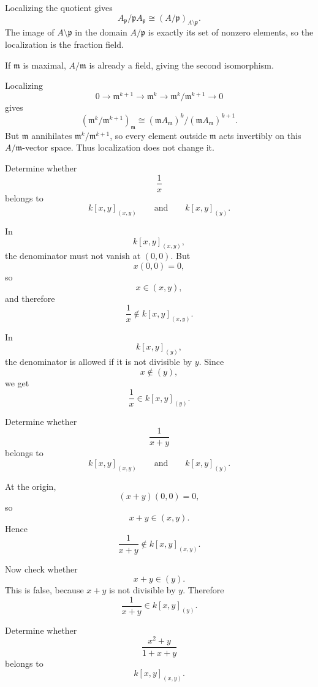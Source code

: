 \begin{solution}
Localizing the quotient gives
\[
A_{\mathfrak p}/\mathfrak pA_{\mathfrak p}
\cong
(A/\mathfrak p)_{A\setminus\mathfrak p}.
\]
The image of \(A\setminus\mathfrak p\) in the domain \(A/\mathfrak p\) is
exactly its set of nonzero elements, so the localization is the fraction
field.

If \(\mathfrak m\) is maximal, \(A/\mathfrak m\) is already a field, giving
the second isomorphism.

Localizing
\[
0\to\mathfrak m^{k+1}\to\mathfrak m^k
\to\mathfrak m^k/\mathfrak m^{k+1}\to0
\]
gives
\[
(\mathfrak m^k/\mathfrak m^{k+1})_{\mathfrak m}
\cong
(\mathfrak mA_{\mathfrak m})^k/
(\mathfrak mA_{\mathfrak m})^{k+1}.
\]
But \(\mathfrak m\) annihilates
\(\mathfrak m^k/\mathfrak m^{k+1}\), so every element outside
\(\mathfrak m\) acts invertibly on this \(A/\mathfrak m\)-vector space.
Thus localization does not change it.
\end{solution}


\begin{problem}[CP-V-0066]
\label{prob:cp-v-0066}
Determine whether
\[
\frac{1}{x}
\]
belongs to
\[
k[x,y]_{(x,y)}
\qquad\text{and}\qquad
k[x,y]_{(y)}.
\]
\end{problem}

\begin{solution}
In
\[
k[x,y]_{(x,y)},
\]
the denominator must not vanish at \((0,0)\). But
\[
x(0,0)=0,
\]
so
\[
x\in (x,y),
\]
and therefore
\[
\frac{1}{x}\notin k[x,y]_{(x,y)}.
\]

In
\[
k[x,y]_{(y)},
\]
the denominator is allowed if it is not divisible by \(y\). Since
\[
x\notin (y),
\]
we get
\[
\frac{1}{x}\in k[x,y]_{(y)}.
\]
\end{solution}


\begin{problem}[CP-V-0067]
\label{prob:cp-v-0067}
Determine whether
\[
\frac{1}{x+y}
\]
belongs to
\[
k[x,y]_{(x,y)}
\qquad\text{and}\qquad
k[x,y]_{(y)}.
\]
\end{problem}

\begin{solution}
At the origin,
\[
(x+y)(0,0)=0,
\]
so
\[
x+y\in (x,y).
\]
Hence
\[
\frac{1}{x+y}\notin k[x,y]_{(x,y)}.
\]

Now check whether
\[
x+y\in (y).
\]
This is false, because \(x+y\) is not divisible by \(y\). Therefore
\[
\frac{1}{x+y}\in k[x,y]_{(y)}.
\]
\end{solution}


\begin{problem}[CP-V-0068]
\label{prob:cp-v-0068}
Determine whether
\[
\frac{x^2+y}{1+x+y}
\]
belongs to
\[
k[x,y]_{(x,y)}.
\]
\end{problem}

